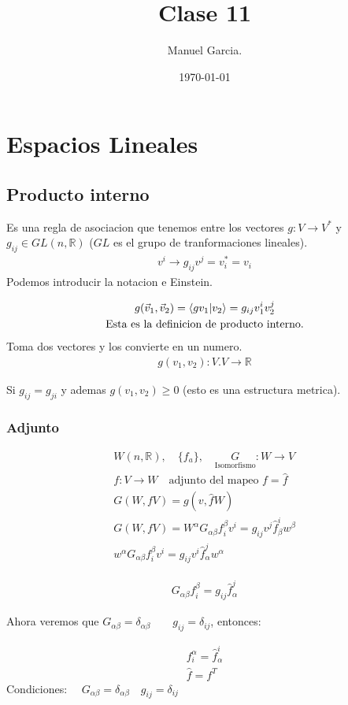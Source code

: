 \documentclass{article}
\title{Clase 11}
\author{Manuel Garcia.}
\date{\today}
\newcommand{\caja}[3]{%
  \begin{tcolorbox}[colback=#1!5!white,colframe=#1!25!black,title=#2]
    #3
  \end{tcolorbox}%
}
\begin{document}
\maketitle

\section{Espacios Lineales}
\subsection{Producto interno }
Es una regla de asociacion que tenemos entre los vectores $ g: V \rightarrow V ^ {* } $ y $ g _{ij } \in GL(n, \mathbb{R}) $ ($ GL  $ es el grupo de tranformaciones lineales). 
\begin{gather*}
  v ^ {i }\rightarrow g _{ij } v ^ {j } = v _{i } ^ {* }= v _{i} 
\end{gather*}
Podemos introducir la notacion e Einstein. 
\caja{red}{}{
  \begin{gather*}
    g(\vec v_1,\vec v_2) = \bra{g v_1 }\ket{v_2 } = g _{ij } v_1 ^ {i } v_2 ^ {j }\\
    \text{Esta es la definicion de producto interno.}
  \end{gather*}
  Toma dos vectores y los convierte en un numero. 
  \begin{gather*}
    g(v_1,v_2): V. V \rightarrow \mathbb{R} 
  \end{gather*}
}
Si $ g _{ij }  = g _{ji }  $ y ademas $ g(v_1,v_2) \geq 0  $ (esto es una estructura metrica). 

\subsubsection{Adjunto}
\begin{gather*}
  W(n, \mathbb{R}),\quad \{f_a \} , \quad\underset{\text{Isomorfismo}}{G}: W \rightarrow V\\
  f: V \rightarrow W \quad \text{adjunto del mapeo }f = \hat f\\
  G(W,fV) = g (v, \hat f W)\\
  G(W,fV) = W ^ {\alpha} G _{\alpha\beta} f ^ {\beta}_i v ^ {i } = g _{ij } v ^ {j } \hat f_\beta^i w ^ {\beta }\\
  w ^ {\alpha} G _{\alpha\beta} f _{i } ^ {\beta} v ^ {i } = g _{ij } v ^ {i }\hat f ^ {j }_{\alpha} w ^ {\alpha}
\end{gather*}
\caja{red}{}{
  \begin{gather*}
    G _{\alpha\beta} f _{i } ^ {\beta} = g _{ij } \hat f _{\alpha} ^ {j } 
  \end{gather*}
}
Ahora veremos que $ G _{\alpha\beta} = \delta _{\alpha\beta } \qquad g _{ij } = \delta _{ij }  $, entonces: 
\caja{red}{}{
  \begin{gather*}
    f _{i } ^ {\alpha} = \hat f _\alpha ^ {i }\\
    \hat f = f ^ {T }
  \end{gather*}
  Condiciones: $ \quad G _{\alpha\beta} = \delta _{\alpha\beta } \quad g _{ij } = \delta _{ij } $
}
\end{document}
